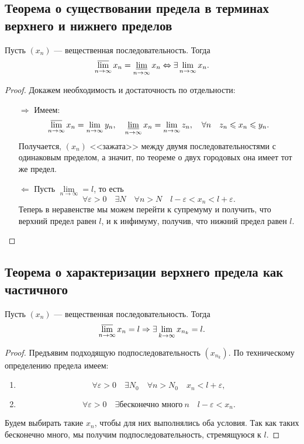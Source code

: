 \subsection{Теорема о существовании предела в терминах верхнего и нижнего пределов}

\begin{theorem}
	Пусть \((x_n)\) --- вещественная последовательность. Тогда \[
	\varlimsup_{n \to \infty} x_n = \varliminf_{n \to \infty} x_n \Leftrightarrow \exists \lim_{n \to \infty} x_n.
	\]
\end{theorem}

\begin{proof}
	Докажем необходимость и достаточность по отдельности:
	\begin{enumerate}
		\item[\(\Rightarrow\)] Имеем: \[
		\varlimsup_{n \to \infty} x_n = \lim_{n \to \infty} y_n, \quad
		\varliminf_{n \to \infty} x_n = \lim_{n \to \infty} z_n, \quad
		\forall n \quad z_n \leqslant x_n \leqslant y_n.
		\]
		Получается, \((x_n)\) <<зажата>> между двумя последовательностями с одинаковым пределом, а значит, по теореме о двух городовых она имеет тот же предел.
		\item[\(\Leftarrow\)] Пусть \(\lim\limits_{n \to \infty} = l\), то есть \[
		\forall \varepsilon > 0 \quad \exists N \quad \forall n > N \quad l - \varepsilon < x_n < l + \varepsilon.
		\]
		Теперь в неравенстве мы можем перейти к супремуму и получить, что верхний предел равен \(l\), и к инфимуму, получив, что нижний предел равен \(l\). 
	\end{enumerate} 
\end{proof}

\subsection{Теорема о характеризации верхнего предела как частичного}

\begin{theorem}
	Пусть \((x_n)\) --- вещественная последовательность. Тогда \[
	\varlimsup_{n \to \infty} x_n = l \Rightarrow \exists \lim_{k \to \infty} x_{n_k} = l.
	\]
\end{theorem}

\begin{proof}
	Предъявим подходящую подпоследовательность \((x_{n_k})\). По техническому определению предела имеем:
	\begin{enumerate}
		\item \[
		\forall \varepsilon > 0 \quad \exists N_0 \quad \forall n > N_0 \quad x_n < l + \varepsilon,
		\]
		\item \[
		\forall \varepsilon > 0 \quad \exists \textit{бесконечно много} \ n \quad l - \varepsilon < x_n.
		\]
	\end{enumerate}
	Будем выбирать такие \(x_n\), чтобы для них выполнялись оба условия. Так как таких бесконечно много, мы получим подпоследовательность, стремящуюся к \(l\).
\end{proof}


